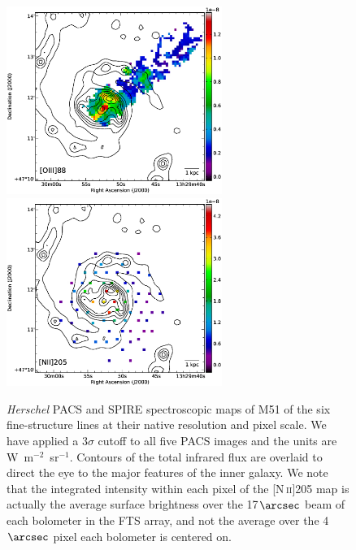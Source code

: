 \documentclass[preprint2]{aastex}
\begin{document}
\begin{figure}
 \includegraphics[width=7.0cm]{Figure2e}
 \includegraphics[width=7.0cm]{Figure2f}
\caption{\emph{Herschel} PACS and SPIRE spectroscopic maps of M51 of the six fine-structure lines at their native resolution and pixel scale.  We have applied a 3$\sigma$ cutoff to all five PACS images and the units are W~m$^{-2}$~sr$^{-1}$.  Contours of the total infrared flux are overlaid to direct the eye to the major features of the inner galaxy.  We note that the integrated intensity within each pixel of the [N\,\textsc{ii}]205 map is actually the average surface brightness over the 17$\arcsec$ beam of each bolometer in the FTS array, and not the average over the 4$\arcsec$ pixel each bolometer is centered on.}
\label{fig:pacs_spec_maps}
\end{figure}
\end{document}
